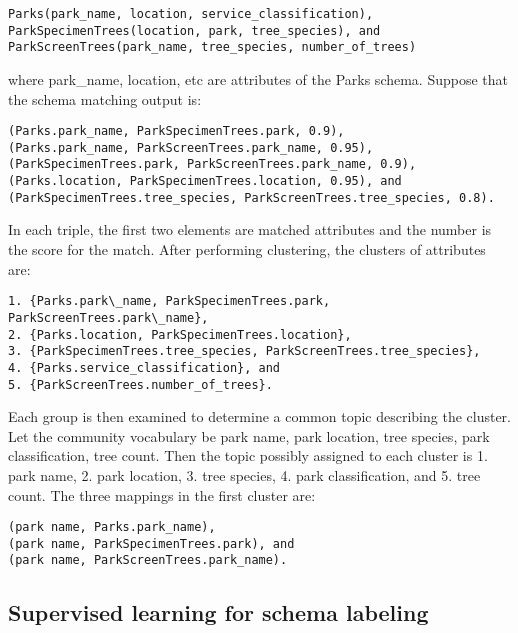 \begin{lstlisting}
Parks(park_name, location, service_classification),
ParkSpecimenTrees(location, park, tree_species), and
ParkScreenTrees(park_name, tree_species, number_of_trees)
\end{lstlisting}

where park\_name, location, etc are attributes of the Parks schema. Suppose that the schema matching output is:
\begin{lstlisting}
(Parks.park_name, ParkSpecimenTrees.park, 0.9),
(Parks.park_name, ParkScreenTrees.park_name, 0.95),
(ParkSpecimenTrees.park, ParkScreenTrees.park_name, 0.9),
(Parks.location, ParkSpecimenTrees.location, 0.95), and
(ParkSpecimenTrees.tree_species, ParkScreenTrees.tree_species, 0.8).
\end{lstlisting}

In each triple, the first two elements are matched attributes and the number is the score for the match. After performing clustering, the clusters of attributes are:
\begin{lstlisting}
1. {Parks.park\_name, ParkSpecimenTrees.park, ParkScreenTrees.park\_name},
2. {Parks.location, ParkSpecimenTrees.location},
3. {ParkSpecimenTrees.tree_species, ParkScreenTrees.tree_species},
4. {Parks.service_classification}, and
5. {ParkScreenTrees.number_of_trees}.
\end{lstlisting}
Each group is then examined to determine a common topic describing the cluster. Let the community vocabulary be {park name, park location, tree species, park classification, tree count}. Then the topic possibly assigned to each cluster is {1. park name, 2. park location, 3. tree species, 4. park classification, and 5. tree count}. The three mappings in the first cluster are:

\begin{lstlisting}
(park name, Parks.park_name),
(park name, ParkSpecimenTrees.park), and
(park name, ParkScreenTrees.park_name).
\end{lstlisting}

\subsection{Supervised learning for schema labeling}
\label{ssec:SupervisedLearningForSchemaLabeling}


